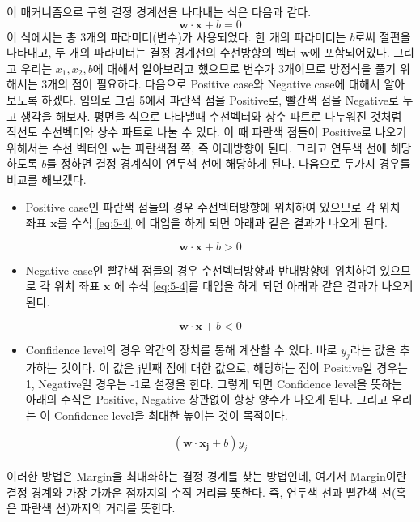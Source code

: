 \documentclass[a4paper]{oblivoir}
\begin{document}
\indent 이 매커니즘으로 구한 결정 경계선을 나타내는 식은 다음과 같다. 
\begin{equation}
\mathbf{w\cdot x}+b=0
\label{eq:5-4}
\end{equation}
\indent 이 식에서는 총 3개의 파라미터(변수)가 사용되었다. 한 개의 파라미터는 $b$로써 절편을 나타내고, 두 개의 파라미터는 결정 경계선의 수선방향의 벡터 $\mathbf{w}$에 포함되어있다. 그리고 우리는 $x_1,x_2,b$에 대해서 알아보려고 했으므로 변수가 3개이므로 방정식을 풀기 위해서는 3개의 점이 필요하다. 다음으로 Positive case와 Negative case에 대해서 알아보도록 하겠다. 임의로 그림 5에서 파란색 점을 Positive로, 빨간색 점을 Negative로 두고 생각을 해보자. 평면을 식으로 나타낼때 수선벡터와 상수 파트로 나누워진 것처럼 직선도 수선벡터와 상수 파트로 나눌 수 있다. 이 때 파란색 점들이 Positive로 나오기 위해서는 수선 벡터인 $\mathbf{w}$는 파란색점 쪽, 즉 아래방향이 된다. 그리고 연두색 선에 해당하도록 $b$를 정하면 결정 경계식이 연두색 선에 해당하게 된다. 다음으로 두가지 경우를 비교를 해보겠다.
\begin{itemize}\setlength\itemsep{-\parsep}
	\item Positive case인 파란색 점들의 경우 수선벡터방향에 위치하여 있으므로 각 위치 좌표 $\mathbf{x}$를 수식 \eqref{eq:5-4} 에 			대입을 하게 되면 아래과 같은 결과가 나오게 된다.
\end{itemize}
\begin{equation}
\mathbf{w\cdot x}+b>0
\label{eq:5-5}
\end{equation}
\begin{itemize}\setlength\itemsep{-\parsep}
	\item Negative case인 빨간색 점들의 경우 수선벡터방향과 반대방향에 위치하여 있으므로 각 위치 좌표 $\mathbf{x}$ 에 수식 				\eqref{eq:5-4}를 대입을 하게 되면 아래과 같은 결과가 나오게 된다.
\end{itemize}
\begin{equation}
\mathbf{w\cdot x}+b<0
\label{eq:5-6}
\end{equation}
\begin{itemize}\setlength\itemsep{-\parsep}
	\item Confidence level의 경우 약간의 장치를 통해 계산할 수 있다. 바로 $y_j$라는 값을 추가하는 것이다. 이 값은  j번째 점에 대한 값으로, 해당하는 점이 Positive일 경우는 1, Negative일 경우는 -1로 설정을 한다. 그렇게 되면 Confidence level을 뜻하는 아래의 수식은 Positive, Negative 상관없이 항상 양수가 나오게 된다. 그리고 우리는 이 Confidence level을 최대한 높이는 것이 목적이다.
\end{itemize}
\begin{equation}
(\mathbf{w\cdot x_j}+b)y_j
\label{eq:5-7}
\end{equation}\\
\indent 이러한 방법은 Margin을 최대화하는 결정 경계를 찾는 방법인데, 여기서 Margin이란 결정 경계와 가장 가까운 점까지의 수직 거리를 뜻한다. 즉, 연두색 선과 빨간색 선(혹은 파란색 선)까지의 거리를 뜻한다.\\
\end{document}
